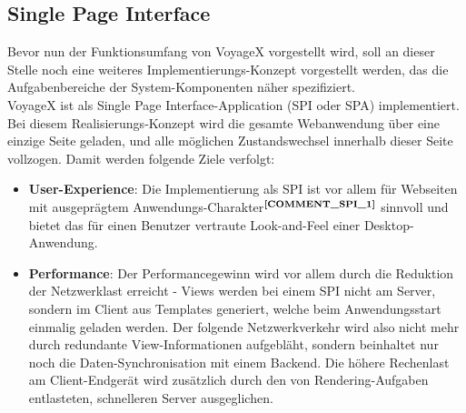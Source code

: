 \subsection{Single Page Interface}\label{5_SPI}
Bevor nun der Funktionsumfang von VoyageX vorgestellt wird, soll an dieser Stelle noch eine weiteres Implementierungs-Konzept vorgestellt werden, das die Aufgabenbereiche der System-Komponenten näher spezifiziert.\\
VoyageX ist als Single Page Interface-Application (SPI oder SPA) implementiert. Bei diesem Realisierungs-Konzept wird die gesamte Webanwendung über eine einzige Seite geladen, und alle möglichen Zustandswechsel innerhalb dieser Seite vollzogen. Damit werden folgende Ziele verfolgt:
\begin{itemize}[leftmargin=*,noitemsep,topsep=1ex,parsep=0pt,partopsep=0pt]
\item \textbf{User-Experience}: Die Implementierung als SPI ist vor allem für Webseiten mit ausgeprägtem Anwendungs-Charakter$^{\textbf{\ref{COMMENT_SPI_1}}}$ sinnvoll und bietet das für einen Benutzer vertraute Look-and-Feel einer Desktop-Anwendung.%
\addtocounter{footnote}{1}
\item \textbf{Performance}: Der Performancegewinn wird vor allem durch die Reduktion der Netzwerklast erreicht - Views werden bei einem SPI nicht am Server, sondern im Client aus Templates generiert, welche beim Anwendungsstart einmalig geladen werden. Der folgende Netzwerkverkehr wird also nicht mehr durch redundante View-Informationen aufgebläht, sondern beinhaltet nur noch die Daten-Synchronisation mit einem Backend. Die höhere Rechenlast am Client-Endgerät wird zusätzlich durch den von Rendering-Aufgaben entlasteten, schnelleren Server ausgeglichen.
\end{itemize}
\noindent
